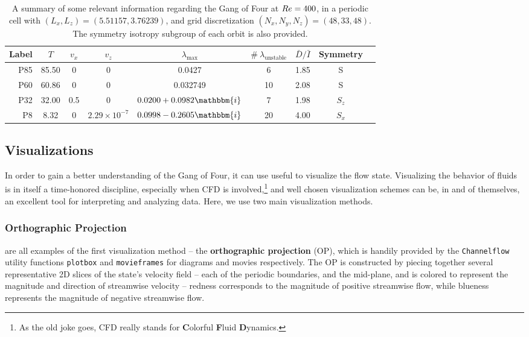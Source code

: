 \begin{table}[h!]
\caption{A summary of some relevant information regarding the Gang of Four at $Re = 400$, in a periodic cell with $(L_x,L_z) = (5.51157, 3.76239)$, and grid discretization $(N_x,N_y,N_z)= (48,33,48)$. The symmetry isotropy subgroup of each orbit is also provided.}\label{tab:summary}
\begin{center}
\begin{tabular}{r   c  c  c  c  c  c  c  l }
\toprule
Label & $T$ & $v_x$ & $v_z$ &  $\lambda_{\textrm{max}}$ & $\#\ \lambda_{\textrm{unstable}}$ & $\bar{D}/\bar{I}$&  Symmetry \\
\midrule
\midrule
P85 & 85.50 & 0 & 0 & 0.0427 & 6 &1.85 & S\\
P60 & 60.86 & 0 & 0 &  0.032749 & 10 & 2.08 & S\\
P32 & 32.00 & 0.5 & 0 &  $0.0200 + 0.0982 \mathbbm{i}$ & 7& 1.98 &$S_z$\\
P8 & 8.32 & 0 & $2.29\times 10^{-7}$ & $0.0998 - 0.2605 \mathbbm{i}$ &20& 4.00& $S_x$\\
\bottomrule
\end{tabular}
\end{center}
\end{table}

\subsection{Visualizations}   
In order to gain a better understanding of the Gang of Four, it can use useful to visualize the flow state. Visualizing the behavior of fluids is in itself a time-honored discipline, especially when CFD is involved,\footnote{As the old joke goes, CFD really stands for {\bf C}olorful {\bf F}luid {\bf D}ynamics.} and well chosen visualization schemes can be, in and of themselves, an excellent tool for interpreting and analyzing data. Here, we use two main visualization methods.
\subsubsection{Orthographic Projection}
 are all examples of the first visualization method -- the {\bf orthographic projection} (OP), which is handily provided by the {\tt Channelflow} utility functions {\tt plotbox} and {\tt movieframes} for diagrams and movies respectively. The OP is constructed by piecing together several representative 2D slices of the state's velocity field -- each of the periodic boundaries, and the mid-plane, and is colored to represent the magnitude and direction of streamwise velocity -- redness corresponds to the magnitude of positive streamwise flow, while blueness represents the magnitude of negative streamwise flow.\\

